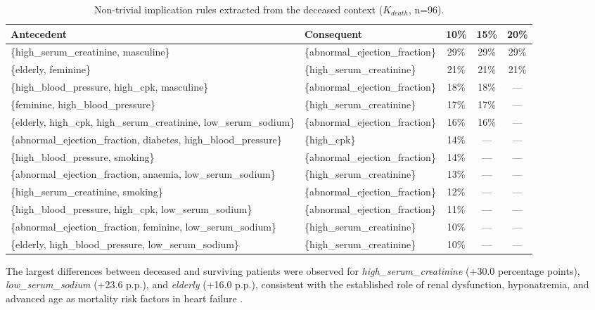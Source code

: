 \documentclass[a4paper,twoside]{article}
\begin{document}
\begin{table}[hbt]
\caption{Non-trivial implication rules extracted from the deceased context ($K_{death}$, n=96).}\label{tab:rules_death}
\centering
{
\begin{tabular}{|p{6cm}|p{4cm}|c|c|c|}
  \hline
  \textbf{Antecedent} & \textbf{Consequent} & \textbf{10\%} & \textbf{15\%} & \textbf{20\%} \\
  \hline
  \{high\_serum\_creatinine, masculine\} & \{abnormal\_ejection\_fraction\} & 29\% & 29\% & 29\% \\
  \{elderly, feminine\} & \{high\_serum\_creatinine\} & 21\% & 21\% & 21\% \\
  \{high\_blood\_pressure, high\_cpk, masculine\} & \{abnormal\_ejection\_fraction\} & 18\% & 18\% & --- \\
  \{feminine, high\_blood\_pressure\} & \{high\_serum\_creatinine\} & 17\% & 17\% & --- \\
  \{elderly, high\_cpk, high\_serum\_creatinine, low\_serum\_sodium\} & \{abnormal\_ejection\_fraction\} & 16\% & 16\% & --- \\
  \{abnormal\_ejection\_fraction, diabetes, high\_blood\_pressure\} & \{high\_cpk\} & 14\% & --- & --- \\
  \{high\_blood\_pressure, smoking\} & \{abnormal\_ejection\_fraction\} & 14\% & --- & --- \\
  \{abnormal\_ejection\_fraction, anaemia, low\_serum\_sodium\} & \{high\_serum\_creatinine\} & 13\% & --- & --- \\
  \{high\_serum\_creatinine, smoking\} & \{abnormal\_ejection\_fraction\} & 12\% & --- & --- \\
  \{high\_blood\_pressure, high\_cpk, low\_serum\_sodium\} & \{abnormal\_ejection\_fraction\} & 11\% & --- & --- \\
  \{abnormal\_ejection\_fraction, feminine, low\_serum\_sodium\} & \{high\_serum\_creatinine\} & 10\% & --- & --- \\
  \{elderly, high\_blood\_pressure, low\_serum\_sodium\} & \{high\_serum\_creatinine\} & 10\% & --- & --- \\
  \hline
\end{tabular}}
\end{table}

The largest differences between deceased and surviving patients were observed for \textit{high\_serum\_creatinine} (+30.0 percentage points), \textit{low\_serum\_sodium} (+23.6 p.p.), and \textit{elderly} (+16.0 p.p.), consistent with the established role of renal dysfunction, hyponatremia, and advanced age as mortality risk factors in heart failure \cite{Ahmad2017,ChiccoJurman2020}. 
\end{document}

